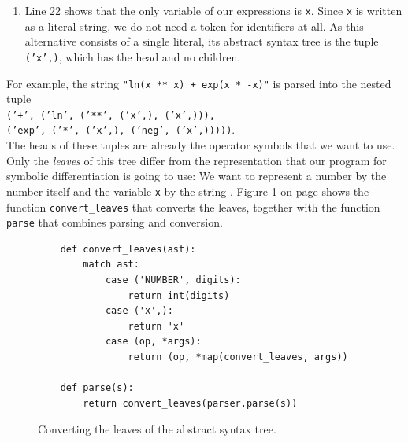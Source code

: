 \begin{enumerate}
      would be the tuples
      \\[0.2cm]
      \hspace*{1.3cm}
      \texttt{('exp', '(', ')')} \quad and \quad \texttt{('ln', '(', ')')}.
      \\[0.2cm]
      With the aliases, the abstract syntax tree of the string \texttt{"exp(x)"} is the pair
      \texttt{('exp', $\textsl{ast}$)}.
\item Line 22 shows that the only variable of our expressions is \texttt{x}.  Since \texttt{x} is written
      as a literal string, we do not need a token for identifiers at all.  As this alternative consists of a
      single literal, its abstract syntax tree is the tuple \texttt{('x',)}, which has the head  and
      no children.
\end{enumerate}
\FloatBarrier

\noindent
For example, the string \texttt{"ln(x ** x) + exp(x * -x)"} is parsed into the nested tuple
\\[0.2cm]
\hspace*{0.3cm}
\texttt{('+', ('ln', ('**', ('x',), ('x',))),}
\\
\hspace*{0.8cm}
\texttt{('exp', ('*', ('x',), ('neg', ('x',)))))}.
\\[0.2cm]
The heads of these tuples are already the operator symbols that we want to use.  Only the \emph{leaves} of this
tree differ from the representation that our program for symbolic differentiation is going to use:  We want to
represent a number by the number itself and the variable \texttt{x} by the string .
Figure \ref{fig:02-Differentiator.ipynb:ast} on page \pageref{fig:02-Differentiator.ipynb:ast} shows the
function \texttt{convert\_leaves} that converts the leaves, together with the function \texttt{parse} that
combines parsing and conversion.

\begin{figure}[!ht]
\centering
\begin{verbatim}
    def convert_leaves(ast):
        match ast:
            case ('NUMBER', digits):
                return int(digits)
            case ('x',):
                return 'x'
            case (op, *args):
                return (op, *map(convert_leaves, args))

    def parse(s):
        return convert_leaves(parser.parse(s))
\end{verbatim}
\vspace*{-0.3cm}
\caption{Converting the leaves of the abstract syntax tree.}
\label{fig:02-Differentiator.ipynb:ast}
\end{figure}

